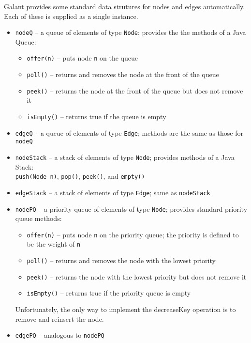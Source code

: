 Galant provides some standard data strutures for nodes and edges automatically.
Each of these is supplied as a single instance.
\begin{itemize}

\item
  \texttt{nodeQ} -- a queue of elements of type \texttt{Node}; provides the
  the methods of a Java Queue:
  \begin{itemize}
    \item
      \texttt{offer(n)} -- puts node \verb+n+ on the queue
    \item
      \texttt{poll()} -- returns and removes the node at the front of the queue
    \item
      \texttt{peek()} -- returns the node at the front of the queue but does not remove it
    \item
      \texttt{isEmpty()} -- returns \textsf{true} if the queue is empty
  \end{itemize}

\item
  \texttt{edgeQ} -- a queue of elements of type \texttt{Edge}; methods are
  the same as those for \texttt{nodeQ}

\item
  \texttt{nodeStack} -- a stack of elements of type \texttt{Node}; provides
  methods of a Java Stack:\\
  \texttt{push(Node n)}, \texttt{pop()}, \texttt{peek()}, and \texttt{empty()}

\item
  \texttt{edgeStack} -- a stack of elements of type \texttt{Edge}; same as
  \texttt{nodeStack}

\item
  \texttt{nodePQ} -- a priority queue of elements of type \texttt{Node};
  provides standard priority queue methods:
  \begin{itemize}
    \item
      \texttt{offer(n)} -- puts node \verb+n+ on the priority queue; the priority is defined to be the weight of \verb+n+
    \item
      \texttt{poll()} -- returns and removes the node with the lowest priority
    \item
      \texttt{peek()} -- returns the node with the lowest priority but does not remove it
    \item
      \texttt{isEmpty()} -- returns \textsf{true} if the priority queue is empty
  \end{itemize}
  Unfortunately, the only way to implement the \textsf{decreaseKey} operation
  is to remove and reinsert the node.

  \item
    \texttt{edgePQ} -- analogous to \texttt{nodePQ}

\end{itemize}

